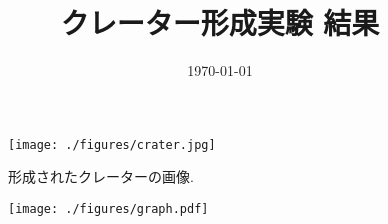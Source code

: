 \documentclass[a4paper]{ltjsarticle}
\begin{document}
\title{クレーター形成実験 結果}
\date{\today}
\maketitle
\thispagestyle{empty}
\begin{figure}[H]
    \centering
    \texttt{[image: ./figures/crater.jpg]}
    \caption{形成されたクレーターの画像.}
\end{figure}
\begin{figure}[H]
    \centering
    \texttt{[image: ./figures/graph.pdf]}
\end{figure}
\end{document}
